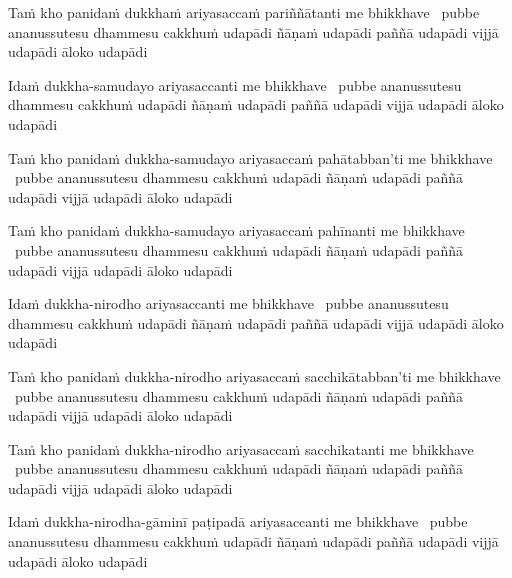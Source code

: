\begin{pali-hang}
  Taṁ kho panidaṁ dukkhaṁ ariyasaccaṁ pariññātanti me bhikkhave \breathmark\ pubbe ananussutesu dhammesu cakkhuṁ udapādi ñāṇaṁ udapādi paññā udapādi vijjā udapādi āloko udapādi
\end{pali-hang}

\begin{pali-hang}
  Idaṁ dukkha-samudayo ariyasaccanti me bhikkhave \breathmark\ pubbe ananussutesu dhammesu cakkhuṁ udapādi ñāṇaṁ udapādi paññā udapādi vijjā udapādi āloko udapādi
\end{pali-hang}

\begin{pali-hang}
  Taṁ kho panidaṁ dukkha-samudayo ariyasaccaṁ pahātabban'ti me bhikkhave \breathmark\ pubbe ananussutesu dhammesu cakkhuṁ udapādi ñāṇaṁ udapādi paññā udapādi vijjā udapādi āloko udapādi
\end{pali-hang}

\begin{pali-hang}
  Taṁ kho panidaṁ dukkha-samudayo ariyasaccaṁ pahīnanti me bhikkhave \breathmark\ pubbe ananussutesu dhammesu cakkhuṁ udapādi ñāṇaṁ udapādi paññā udapādi vijjā udapādi āloko udapādi
\end{pali-hang}

\begin{pali-hang}
  Idaṁ dukkha-nirodho ariyasaccanti me bhikkhave \breathmark\ pubbe ananussutesu dhammesu cakkhuṁ udapādi ñāṇaṁ udapādi paññā udapādi vijjā udapādi āloko udapādi
\end{pali-hang}

\begin{pali-hang}
  Taṁ kho panidaṁ dukkha-nirodho ariyasaccaṁ sacchikātabban'ti me bhikkhave \breathmark\ pubbe ananussutesu dhammesu cakkhuṁ udapādi ñāṇaṁ udapādi paññā udapādi vijjā udapādi āloko udapādi
\end{pali-hang}

\begin{pali-hang}
  Taṁ kho panidaṁ dukkha-nirodho ariyasaccaṁ sacchikatanti me bhikkhave \breathmark\ pubbe ananussutesu dhammesu cakkhuṁ udapādi ñāṇaṁ udapādi paññā udapādi vijjā udapādi āloko udapādi
\end{pali-hang}

\begin{pali-hang}
  Idaṁ dukkha-nirodha-gāminī paṭipadā ariyasaccanti me bhikkhave \breathmark\ pubbe ananussutesu dhammesu cakkhuṁ udapādi ñāṇaṁ udapādi paññā udapādi vijjā udapādi āloko udapādi
\end{pali-hang}

